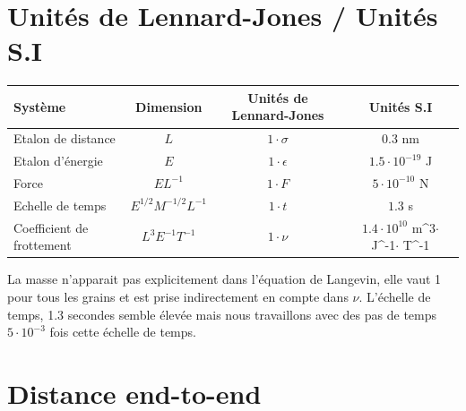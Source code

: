 \documentclass[a4paper,11pt]{article}
\begin{document}
\section*{Unités de Lennard-Jones / Unités S.I}
\begin{center}


\begin{tabular}{|l|c|c|c|}
  \hline
 Système & Dimension & Unités de Lennard-Jones & Unités S.I \\
  \hline
  Etalon de distance & $L$ & $1\cdot\sigma$ & 0.3 nm \\
  Etalon d'énergie & $E$ & $1\cdot\epsilon$ & $1.5\cdot10^{-19}$ J\\
  Force & $E L^{-1}$ & $1\cdot F$ & $5\cdot10^{-10}$ N\\
     
  Echelle de temps & $E^{1/2} M^{-1/2} L^{-1} $ & $1\cdot t$ & $1.3$ s\\
   Coefficient de frottement & $ L^3 E^{-1} T^{-1}$ & $1\cdot \nu$ & $1.4\cdot10^{10}$ m^{3}$\cdot$ J^{-1}$\cdot$ T^{-1}\\
   
  \hline
\end{tabular}
\end{center}

La masse n'apparait pas explicitement dans l'équation de Langevin, elle vaut 1 pour tous les grains et est prise indirectement en compte dans $\nu$. L'échelle de temps, 1.3 secondes semble élevée mais nous travaillons avec des pas de temps $5\cdot 10^{-3}$ fois cette échelle de temps.


\section*{Distance end-to-end}
\end{document}
